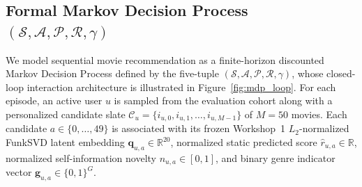 \subsection{Formal Markov Decision Process $(\mathcal{S}, \mathcal{A}, \mathcal{P}, \mathcal{R}, \gamma)$}
\label{subsec:formal_mdp}

We model sequential movie recommendation as a finite-horizon discounted Markov Decision Process defined by the five-tuple $(\mathcal{S}, \mathcal{A}, \mathcal{P}, \mathcal{R}, \gamma)$, whose closed-loop interaction architecture is illustrated in Figure~\ref{fig:mdp_loop}. For each episode, an active user $u$ is sampled from the evaluation cohort along with a personalized candidate slate $\mathcal{C}_u = \{i_{u,0}, i_{u,1}, \dots, i_{u,M-1}\}$ of $M = 50$ movies. Each candidate $a \in \{0, \dots, 49\}$ is associated with its frozen Workshop~1 $L_2$-normalized FunkSVD latent embedding $\mathbf{q}_{u,a} \in \mathbb{R}^{20}$, normalized static predicted score $\hat{r}_{u,a} \in \mathbb{R}$, normalized self-information novelty $n_{u,a} \in [0, 1]$, and binary genre indicator vector $\mathbf{g}_{u,a} \in \{0, 1\}^{G}$.


